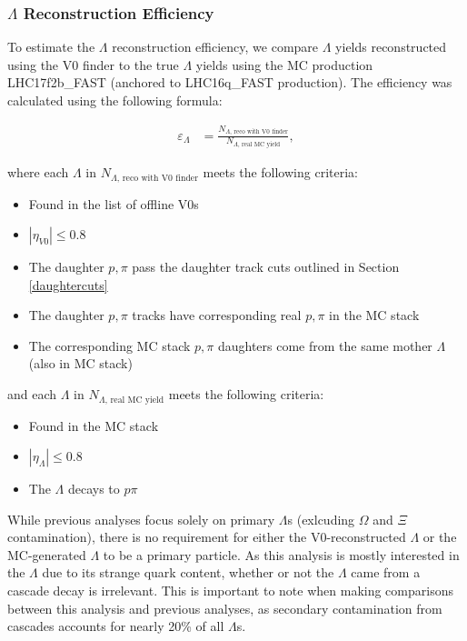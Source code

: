 \documentclass[ALICE,manyauthors]{ALICE_analysis_notes}
\begin{document}
\subsubsection{$\Lambda$ Reconstruction Efficiency}
\label{lambda_efficiency}

To estimate the $\Lambda$ reconstruction efficiency, we compare $\Lambda$ yields reconstructed using the V0 finder to the true $\Lambda$ yields using the MC production LHC17f2b\_FAST (anchored to LHC16q\_FAST production). The efficiency was calculated using the following formula:

\begin{align*}
	\varepsilon_{\Lambda} &=  \frac{N_{\Lambda\text{, reco with V0 finder}}}{N_{\Lambda\text{, real MC yield}}},
\end{align*}

where each $\Lambda$ in $N_{\Lambda\text{, reco with V0 finder}}$ meets the following criteria:

\begin{itemize}
	\item Found in the list of offline V0s
	\item $|\eta_{V0}| \leq 0.8$
	\item The daughter $p, \pi$ pass the daughter track cuts outlined in Section \ref{daughtercuts}
	\item The daughter $p, \pi$ tracks have corresponding real $p, \pi$ in the MC stack
	\item The corresponding MC stack $p, \pi$ daughters come from the same mother $\Lambda$ (also in MC stack)
\end{itemize}

and each $\Lambda$ in $N_{\Lambda\text{, real MC yield}}$ meets the following criteria:

\begin{itemize}
	\item Found in the MC stack
	\item $|\eta_{\Lambda}| \leq 0.8$
	\item The $\Lambda$ decays to $p\pi$
\end{itemize}

While previous analyses focus solely on primary $\Lambda$s (exlcuding $\Omega$ and $\Xi$ contamination), there is no requirement for either the V0-reconstructed $\Lambda$ or the MC-generated $\Lambda$ to be a primary particle. As this analysis is mostly interested in the $\Lambda$ due to its strange quark content, whether or not the $\Lambda$ came from a cascade decay is irrelevant. This is important to note when making comparisons between this analysis and previous analyses, as secondary contamination from cascades accounts for nearly 20\% of all $\Lambda$s.
\end{document}
